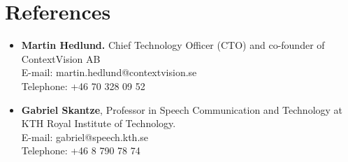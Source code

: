 \documentclass[10pt,a4paper,sans]{moderncv} %
\begin{document}
\section{References}
\begin{itemize}
\item \textbf{Martin Hedlund.}
Chief Technology Officer (CTO) and co-founder of ContextVision AB \\
E-mail: martin.hedlund@contextvision.se \\
Telephone: +46 70 328 09 52

\vspace{10pt}

\item \textbf{Gabriel Skantze}, Professor in Speech Communication and Technology at KTH Royal Institute of Technology. \\
E-mail: gabriel@speech.kth.se \\
Telephone: +46 8 790 78 74
\end{itemize}








\end{document}
